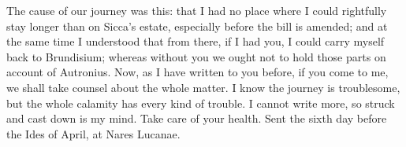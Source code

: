 

The cause of our journey was this: that I had no place where I could rightfully stay longer than on Sicca's estate, especially before the bill is amended; and at the same time I understood that from there, if I had you, I could carry myself back to Brundisium; whereas without you we ought not to hold those parts on account of Autronius. Now, as I have written to you before, if you come to me, we shall take counsel about the whole matter. I know the journey is troublesome, but the whole calamity has every kind of trouble. I cannot write more, so struck and cast down is my mind. Take care of your health. Sent the sixth day before the Ides of April, at Nares Lucanae.
